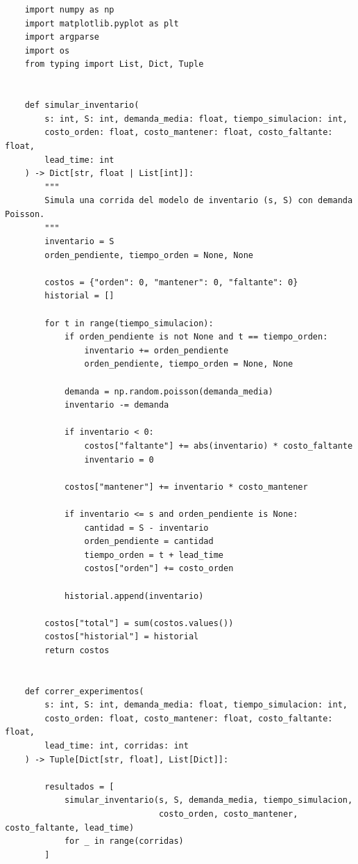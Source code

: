 \documentclass[12pt]{article}
\begin{document}
\begin{verbatim}
    import numpy as np
    import matplotlib.pyplot as plt
    import argparse
    import os
    from typing import List, Dict, Tuple
    
    
    def simular_inventario(
        s: int, S: int, demanda_media: float, tiempo_simulacion: int,
        costo_orden: float, costo_mantener: float, costo_faltante: float,
        lead_time: int
    ) -> Dict[str, float | List[int]]:
        """
        Simula una corrida del modelo de inventario (s, S) con demanda Poisson.
        """
        inventario = S
        orden_pendiente, tiempo_orden = None, None
    
        costos = {"orden": 0, "mantener": 0, "faltante": 0}
        historial = []
    
        for t in range(tiempo_simulacion):
            if orden_pendiente is not None and t == tiempo_orden:
                inventario += orden_pendiente
                orden_pendiente, tiempo_orden = None, None
    
            demanda = np.random.poisson(demanda_media)
            inventario -= demanda
    
            if inventario < 0:
                costos["faltante"] += abs(inventario) * costo_faltante
                inventario = 0
    
            costos["mantener"] += inventario * costo_mantener
    
            if inventario <= s and orden_pendiente is None:
                cantidad = S - inventario
                orden_pendiente = cantidad
                tiempo_orden = t + lead_time
                costos["orden"] += costo_orden
    
            historial.append(inventario)
    
        costos["total"] = sum(costos.values())
        costos["historial"] = historial
        return costos
    
    
    def correr_experimentos(
        s: int, S: int, demanda_media: float, tiempo_simulacion: int,
        costo_orden: float, costo_mantener: float, costo_faltante: float,
        lead_time: int, corridas: int
    ) -> Tuple[Dict[str, float], List[Dict]]:
    
        resultados = [
            simular_inventario(s, S, demanda_media, tiempo_simulacion,
                               costo_orden, costo_mantener, costo_faltante, lead_time)
            for _ in range(corridas)
        ]
    

\end{verbatim}
\end{document}
